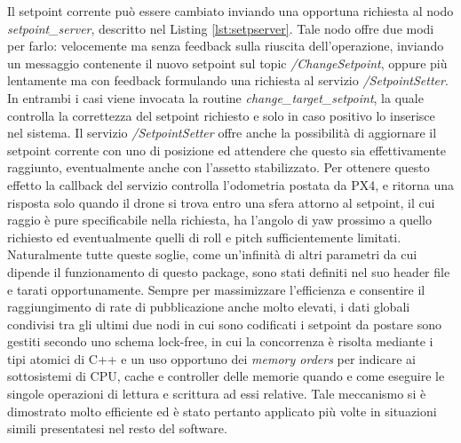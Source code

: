 Il setpoint corrente può essere cambiato inviando una opportuna richiesta al nodo \emph{setpoint\_server}, descritto nel Listing \ref{lst:setpserver}. Tale nodo offre due modi per farlo: velocemente ma senza feedback sulla riuscita dell'operazione, inviando un messaggio contenente il nuovo setpoint sul topic \emph{/ChangeSetpoint}, oppure più lentamente ma con feedback formulando una richiesta al servizio \emph{/SetpointSetter}. In entrambi i casi viene invocata la routine \emph{change\_target\_setpoint}, la quale controlla la correttezza del setpoint richiesto e solo in caso positivo lo inserisce nel sistema. Il servizio \emph{/SetpointSetter} offre anche la possibilità di aggiornare il setpoint corrente con uno di posizione ed attendere che questo sia effettivamente raggiunto, eventualmente anche con l'assetto stabilizzato. Per ottenere questo effetto la callback del servizio controlla l'odometria postata da PX4, e ritorna una risposta solo quando il drone si trova entro una sfera attorno al setpoint, il cui raggio è pure specificabile nella richiesta, ha l'angolo di yaw prossimo a quello richiesto ed eventualmente quelli di roll e pitch sufficientemente limitati. Naturalmente tutte queste soglie, come un'infinità di altri parametri da cui dipende il funzionamento di questo package, sono stati definiti nel suo header file e tarati opportunamente. Sempre per massimizzare l'efficienza e consentire il raggiungimento di rate di pubblicazione anche molto elevati, i dati globali condivisi tra gli ultimi due nodi in cui sono codificati i setpoint da postare sono gestiti secondo uno schema lock-free, in cui la concorrenza è risolta mediante i tipi atomici di C++ e un uso opportuno dei \emph{memory orders} per indicare ai sottosistemi di CPU, cache e controller delle memorie quando e come eseguire le singole operazioni di lettura e scrittura ad essi relative. Tale meccanismo si è dimostrato molto efficiente ed è stato pertanto applicato più volte in situazioni simili presentatesi nel resto del software.\\
